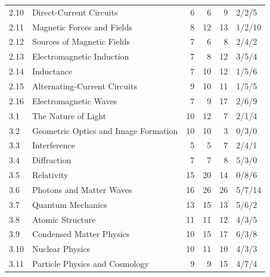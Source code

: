 \begin{longtable}{@{}llrrrl@{}}
2.10 & Direct-Current Circuits & 6 & 6 & 9 & 2/2/5 \\
2.11 & Magnetic Forces and Fields & 8 & 12 & 13 & 1/2/10 \\
2.12 & Sources of Magnetic Fields & 7 & 6 & 8 & 2/4/2 \\
2.13 & Electromagnetic Induction & 7 & 8 & 12 & 3/5/4 \\
2.14 & Inductance & 7 & 10 & 12 & 1/5/6 \\
2.15 & Alternating-Current Circuits & 9 & 10 & 11 & 1/5/5 \\
2.16 & Electromagnetic Waves & 7 & 9 & 17 & 2/6/9 \\
3.1 & The Nature of Light & 10 & 12 & 7 & 2/1/4 \\
3.2 & Geometric Optics and Image Formation & 10 & 10 & 3 & 0/3/0 \\
3.3 & Interference & 5 & 5 & 7 & 2/4/1 \\
3.4 & Diffraction & 7 & 7 & 8 & 5/3/0 \\
3.5 & Relativity & 15 & 20 & 14 & 0/8/6 \\
3.6 & Photons and Matter Waves & 16 & 26 & 26 & 5/7/14 \\
3.7 & Quantum Mechanics & 13 & 15 & 13 & 5/6/2 \\
3.8 & Atomic Structure & 11 & 11 & 12 & 4/3/5 \\
3.9 & Condensed Matter Physics & 10 & 15 & 17 & 6/3/8 \\
3.10 & Nuclear Physics & 10 & 11 & 10 & 4/3/3 \\
3.11 & Particle Physics and Cosmology & 9 & 9 & 15 & 4/7/4 \\
\bottomrule\end{longtable}
